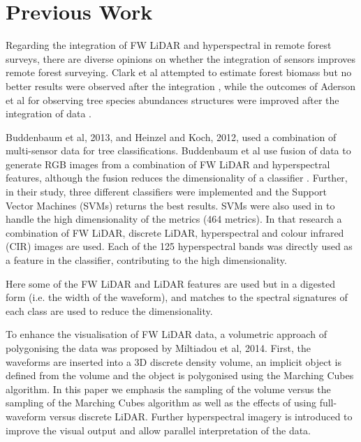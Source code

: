\documentclass{subfiles}
\begin{document}
	\section{Previous Work}
	
	\par Regarding the integration of FW LiDAR and hyperspectral in remote forest surveys, there are diverse opinions on whether the integration of sensors improves remote forest surveying. Clark et al attempted to estimate forest biomass but no better results were observed after the integration \cite{Clark2011}, while the outcomes of Aderson et al for observing tree species abundances structures were improved after the integration of data \cite{Anderson2008}.
	
	\par \cite{Buddenbaum2013} Buddenbaum et al, 2013, and \cite{Heinzel2012} Heinzel and Koch, 2012, used a combination of multi-sensor data for tree classifications. Buddenbaum et al use fusion of data to generate RGB images from a combination of FW LiDAR and hyperspectral features, although the fusion reduces the dimensionality of a classifier \cite{Buddenbaum2013}. Further, in their study, three different classifiers were implemented and the Support Vector Machines (SVMs) returns the best results. SVMs were also used in \cite{Heinzel2012} to handle the high dimensionality of the metrics (464 metrics). In that research a combination of FW LiDAR, discrete LiDAR, hyperspectral and colour infrared (CIR) images are used. Each of the 125 hyperspectral bands was directly used as a feature in the classifier, contributing to the high dimensionality. 
	
	\par Here some of the FW LiDAR and LiDAR features are used but in a digested form (i.e. the width of the waveform), and matches to the spectral signatures of each class are used to reduce the dimensionality.
	
	\par To enhance the visualisation of FW LiDAR data, a volumetric approach of polygonising the data was proposed by Miltiadou et al, 2014. First, the waveforms are inserted into a 3D discrete density volume, an implicit object is defined from the volume and the object is polygonised using the Marching Cubes algorithm. In this paper we emphasis the sampling of the volume versus the sampling of the Marching Cubes algorithm as well as the effects of using full-waveform versus discrete LiDAR. Further hyperspectral imagery is introduced to improve the visual output and allow parallel interpretation of the data.
	
\end{document}
